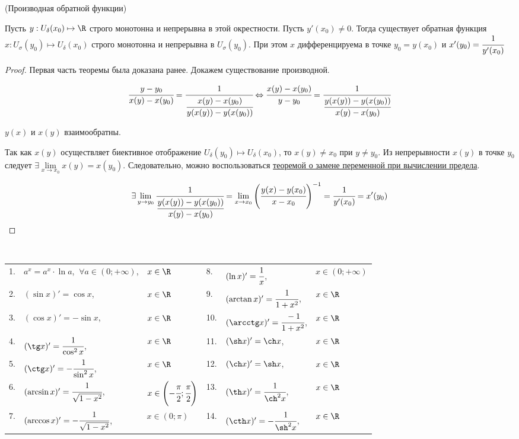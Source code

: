 \begin{theorem}
	\hypertarget{5.11}{(Производная обратной функции)} Пусть $y: U_{\delta}(x_{0}) \mapsto \R$ строго монотонна и непрерывна в этой окрестности. Пусть $y'(x_{0}) \neq 0$. Тогда существует обратная функция $x: U_{\sigma}(y_{0}) \mapsto U_{\delta}(x_{0})$ строго монотонна и непрерывна в $U_{\sigma}(y_{0})$. При этом $x$ дифференцируема в точке $y_{0} = y(x_{0})$ и $x'(y_{0}) = \cfrac{1}{y'(x_{0})}$ 
\end{theorem}
\begin{proof}
	Первая часть теоремы была доказана ранее. Докажем существование производной.
	
	$$\cfrac{y - y_{0}}{x(y) - x(y_{0})} = \cfrac{1}{\cfrac{x(y) - x(y_{0})}{y(x(y)) - y(x(y_{0}))}} \Leftrightarrow \cfrac{x(y) - x(y_{0})}{y - y_{0}} = \cfrac{1}{\cfrac{y(x(y)) - y(x(y_{0}))}{x(y) - x(y_{0})}}$$
	
	$y(x)$ и $x(y)$ взаимообратны.
	
	Так как $x(y)$ осуществляет биективное отображение $U_{\delta} (y_{0}) \mapsto U_{\delta}(x_{0})$, то $x(y) \neq x_{0} $ при $y \neq y_{0}$. Из непрерывности $x(y)$ в точке $y_{0}$ следует $\exists \lim\limits_{x \to x_{0}} x(y) = x(y_{0}).$
	Следовательно, можно воспользоваться \hyperlink{thrm4.17}{теоремой о замене переменной при вычислении предела}.
	
	$$\exists \lim\limits_{y\to y_{0}} \cfrac{1}{\cfrac{y(x(y)) - y(x(y_{0}))}{x(y) - x(y_{0})}} = \lim\limits_{x \to x_{0}}  \left( \cfrac{y(x) - y(x_{0})}{x - x_{0}}\right)^{-1} = \cfrac{1}{y'(x_{0})} = x'(y_{0})$$    
\end{proof}
\begin{corollary}$\ $
	
	\begin{table}[h]
		\begin{tabular}{llllll}
			1. & $a^{x} = a^{x} \cdot \ln a$, $\ \forall a \in (0; +\infty)$, & $x\in \R$ & 8. & $(\ln x)' = \cfrac{1}{x}$, & $x \in \left( 0; +\infty\right)$\\
			2. & $(\sin x)' = \cos x$, & $x \in \R$ & 9. & $(\arctan x)' = \cfrac{1}{1 + x^{2}}$, & $x \in \R$\\
			3. & $(\cos x)' = - \sin x$, & $x \in \R$ & 10. & $(\arcctg x)' = \cfrac{-1}{1 + x^2}$, & $x \in \R$\\
			4. & $(\tg x)' = \cfrac{1}{\cos^{2} x}$, & $x \in \R$ & 11. & $(\sh x)' = \ch x$, & $x\in \R$ \\
			5. & $(\ctg x)' = -\cfrac{1}{\sin^{2} x}$, & $x \in \R$ & 12. & $(\ch x)' = \sh x$, & $x\in \R$\\
			6. & $(\arcsin x)' = \cfrac{1}{\sqrt{1 - x^{2}}}$, & $x \in \left(-\cfrac{\pi}{2}; \cfrac{\pi}{2}\right)$ & 13. & $(\th x)' = \cfrac{1}{\ch^{2} x}$, & $x\in \R$\\
			7. & $(\arccos x)' = -\cfrac{1}{\sqrt{1-x^{2}}}$, & $x \in (0; \pi)$ & 14. & $(\cth x)' = -\cfrac{1}{\sh^{2} x}$, & $x\in \R$\\
		\end{tabular}
	\end{table}
\end{corollary}
